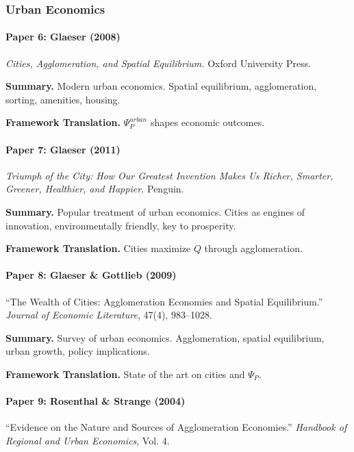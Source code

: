 \subsubsection{Urban Economics}

\paragraph{Paper 6: Glaeser (2008)}

\textit{Cities, Agglomeration, and Spatial Equilibrium.}
Oxford University Press.

\textbf{Summary.}
Modern urban economics. Spatial equilibrium, agglomeration, sorting, 
amenities, housing.

\textbf{Framework Translation.}
$\Psi_P^{urban}$ shapes economic outcomes.

\paragraph{Paper 7: Glaeser (2011)}

\textit{Triumph of the City: How Our Greatest Invention Makes Us Richer, 
Smarter, Greener, Healthier, and Happier.}
Penguin.

\textbf{Summary.}
Popular treatment of urban economics. Cities as engines of innovation, 
environmentally friendly, key to prosperity.

\textbf{Framework Translation.}
Cities maximize $Q$ through agglomeration.

\paragraph{Paper 8: Glaeser \& Gottlieb (2009)}

``The Wealth of Cities: Agglomeration Economies and Spatial Equilibrium.''
\textit{Journal of Economic Literature}, 47(4), 983--1028.

\textbf{Summary.}
Survey of urban economics. Agglomeration, spatial equilibrium, 
urban growth, policy implications.

\textbf{Framework Translation.}
State of the art on cities and $\Psi_P$.

\paragraph{Paper 9: Rosenthal \& Strange (2004)}

``Evidence on the Nature and Sources of Agglomeration Economies.''
\textit{Handbook of Regional and Urban Economics}, Vol. 4.

